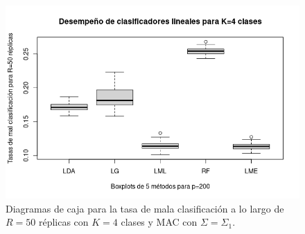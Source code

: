 \documentclass{report}
\begin{document}
\begin{figure} [h]
\begin{multicols}{2}
  		\caption*{$p=100$}
  		\includegraphics[width=\linewidth]{4_clases_p200_sigma_II}\par 
  		\caption*{$p=200$}
  		
  	\end{multicols}
  	\caption{ Diagramas de caja para la tasa de mala clasificación  a lo largo de $R=50$ réplicas con $K=4$ clases  y MAC con $\Sigma=\Sigma_1$. }
  	\label{boxk4alta}
  \end{figure}
  
  
  
\end{document}
